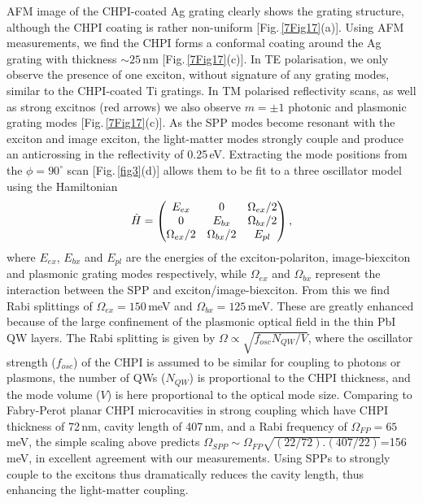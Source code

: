 AFM image of the CHPI-coated Ag grating clearly shows the grating structure, although the CHPI coating is rather non-uniform [Fig.\,\ref{7Fig17}(a)]. Using AFM measurements, we find the CHPI forms a conformal coating around the Ag grating with thickness $\sim25$\,nm [Fig.\,\ref{7Fig17}(c)]. In TE polarisation, we only observe the presence of one exciton, without signature of any grating modes, similar to the CHPI-coated Ti gratings. In TM polarised reflectivity scans, as well as strong excitnos (red arrows) we also observe $m=\pm1$ photonic and plasmonic grating modes [Fig.\,\ref{7Fig17}(c)].  As the SPP modes become resonant with the exciton and image exciton, the light-matter modes strongly couple and produce an anticrossing in the reflectivity of 0.25\,eV. Extracting the mode positions from the $\phi=90^{\circ}$ scan [Fig.\,\ref{fig3}(d)] allows them to be fit to a three oscillator model using the Hamiltonian
\begin{equation}
\centering 
\hat{H}=\left( \begin{matrix} 
E_{ex} & 0 & \Omega_{ex}/2 \\
0 & E_{bx} & \Omega_{bx}/2 \\
\Omega_{ex}/2 & \Omega_{bx}/2 & E_{pl} 
\end{matrix} \right) ,
\end{equation}
where $E_{ex}$, $E_{bx}$ and $E_{pl}$ are the energies of the exciton-polariton, image-biexciton and plasmonic grating modes respectively, while $\Omega_{ex}$ and $\Omega_{bx}$ represent the interaction between the SPP and exciton/image-biexciton. From this we find Rabi splittings of $\Omega_{ex}=150$\,meV and $\Omega_{bx}=125$\,meV. 
These are greatly enhanced because of the large confinement of the plasmonic optical field in the thin PbI QW layers. The Rabi splitting is given by $\Omega \propto \sqrt{f_{osc} N_{QW}/V}$, where the oscillator strength ($f_{osc}$) of the CHPI is assumed to be similar for coupling to photons or plasmons, the number of QWs ($N_{QW}$) is proportional to the CHPI thickness, and the mode volume ($V$) is here proportional to the optical mode size. Comparing to Fabry-Perot planar CHPI microcavities in strong coupling \cite{Pradeesh2009b} which have CHPI thickness of 72\,nm, cavity length of 407\,nm, and a Rabi frequency of $\Omega_{FP}=65$\,meV, the simple scaling above predicts $\Omega_{SPP} \sim \Omega_{FP} \sqrt{(22/72).(407/22)}$=156\,meV, in excellent agreement with our measurements. Using SPPs to strongly couple to the excitons thus dramatically reduces the cavity length, thus enhancing the light-matter coupling.

